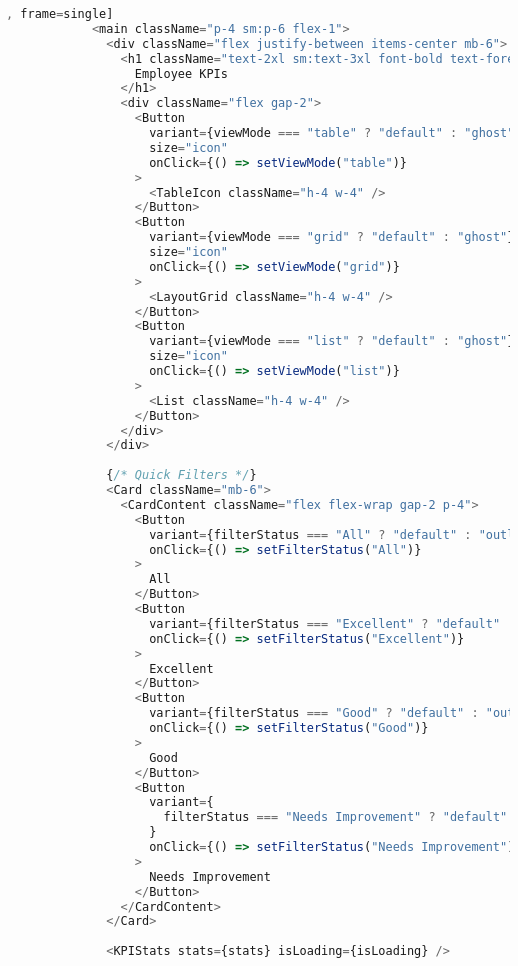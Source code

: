 \begin{lstlisting}[language=Typescript, caption=src/app/protected/kpi/page.tsx [front-end], frame=single]
            <main className="p-4 sm:p-6 flex-1">
              <div className="flex justify-between items-center mb-6">
                <h1 className="text-2xl sm:text-3xl font-bold text-foreground">
                  Employee KPIs
                </h1>
                <div className="flex gap-2">
                  <Button
                    variant={viewMode === "table" ? "default" : "ghost"}
                    size="icon"
                    onClick={() => setViewMode("table")}
                  >
                    <TableIcon className="h-4 w-4" />
                  </Button>
                  <Button
                    variant={viewMode === "grid" ? "default" : "ghost"}
                    size="icon"
                    onClick={() => setViewMode("grid")}
                  >
                    <LayoutGrid className="h-4 w-4" />
                  </Button>
                  <Button
                    variant={viewMode === "list" ? "default" : "ghost"}
                    size="icon"
                    onClick={() => setViewMode("list")}
                  >
                    <List className="h-4 w-4" />
                  </Button>
                </div>
              </div>
    
              {/* Quick Filters */}
              <Card className="mb-6">
                <CardContent className="flex flex-wrap gap-2 p-4">
                  <Button
                    variant={filterStatus === "All" ? "default" : "outline"}
                    onClick={() => setFilterStatus("All")}
                  >
                    All
                  </Button>
                  <Button
                    variant={filterStatus === "Excellent" ? "default" : "outline"}
                    onClick={() => setFilterStatus("Excellent")}
                  >
                    Excellent
                  </Button>
                  <Button
                    variant={filterStatus === "Good" ? "default" : "outline"}
                    onClick={() => setFilterStatus("Good")}
                  >
                    Good
                  </Button>
                  <Button
                    variant={
                      filterStatus === "Needs Improvement" ? "default" : "outline"
                    }
                    onClick={() => setFilterStatus("Needs Improvement")}
                  >
                    Needs Improvement
                  </Button>
                </CardContent>
              </Card>
    
              <KPIStats stats={stats} isLoading={isLoading} />
    

\end{lstlisting}
